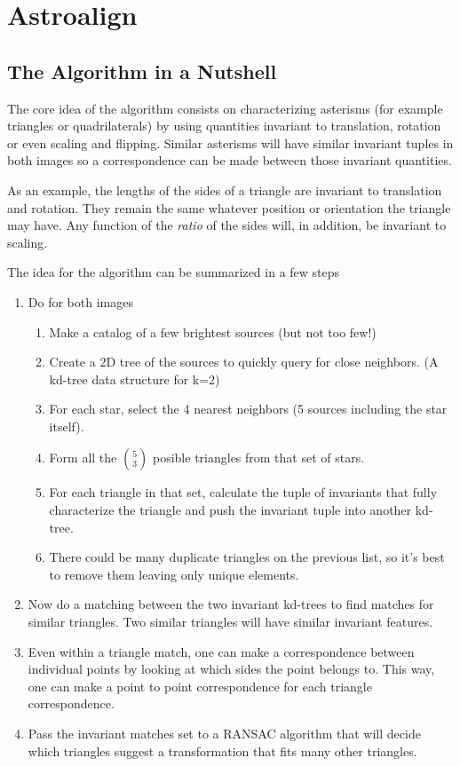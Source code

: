 \section{Astroalign}

\subsection{The Algorithm in a Nutshell}

The core idea of the algorithm consists on characterizing asterisms (for example triangles or quadrilaterals) by using quantities invariant to translation, rotation or even scaling and flipping. Similar asterisms will have similar invariant tuples in both images so a correspondence can be made between those invariant quantities. 

As an example, the lengths of the sides of a triangle are invariant to translation and rotation. They remain the same whatever position or orientation the triangle may have. Any function of the {\em ratio} of the sides will, in addition, be invariant to scaling.

The idea for the algorithm can be summarized in a few steps

\begin{enumerate}
\item Do for both images \begin{enumerate}
\item Make a catalog of a few brightest sources (but not too few!)
\item Create a 2D tree of the sources to quickly query for close neighbors. (A kd-tree data structure for k=2)
\item For each star, select the 4 nearest neighbors (5 sources including the star itself).
\item Form all the ${5}\choose{3}$ posible triangles from that set of stars.
\item For each triangle in that set, calculate the tuple of invariants that fully characterize the triangle and push the invariant tuple into another kd-tree.
\item There could be many duplicate triangles on the previous list, so it's best to remove them leaving only unique elements.
\end{enumerate}
\item Now do a matching between the two invariant kd-trees to find matches for similar triangles. Two similar triangles will have similar invariant features.
\item Even within a triangle match, one can make a correspondence between individual points by looking at which sides the point belongs to. This way, one can make a point to point correspondence for each triangle correspondence.
\item Pass the invariant matches set to a RANSAC algorithm that will decide which triangles suggest a transformation that fits many other triangles.
\end{enumerate}


